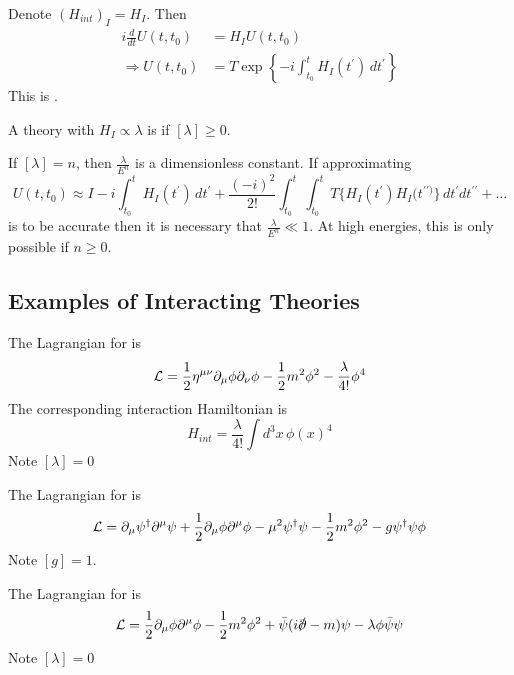 \documentclass{article}
\begin{document}
\begin{theorem}
Denote $(H_{int})_I = H_I$. Then 
\begin{align*}
i \frac{d}{dt} U(t,t_0) &= H_I U(t,t_0) \\
\Rightarrow U(t,t_0) &= T \exp\left\{ -i \int_{t_0}^t H_I(t^\prime) \, dt^\prime \right\}
\end{align*}
This is . 
\end{theorem}

\begin{definition}[Renormalizable]
A theory with $H_I \propto \lambda$ is  if $[\lambda]\geq0$. 
\end{definition}

\begin{idea}
If $[\lambda]=n$, then $\frac{\lambda}{E^n}$ is a dimensionless constant. If approximating 
\[
U(t,t_0) \approx I -i\int_{t_0}^t H_I(t^\prime) \, dt^\prime + \frac{(-i)^2}{2!}\int_{t_0}^t \int_{t_0}^t T\{ H_I(t^\prime) H_I(t^{\prime\prime)} \} \, dt^\prime dt^{\prime\prime} + \dots
\]
is to be accurate then it is necessary that $\frac{\lambda}{E^n} \ll 1$. At high energies, this is only possible if $n\geq0$.
\end{idea}

\subsection{Examples of Interacting Theories}

\begin{definition}
The Lagrangian for  is 
\[
\mathcal{L} = \frac{1}{2}\eta^{\mu\nu} \partial_\mu\phi \partial_\nu\phi-\frac{1}{2}m^2\phi^2 - \frac{\lambda}{4!}\phi^4
\]
The corresponding interaction Hamiltonian is 
\[
H_{int} = \frac{\lambda}{4!} \int d^3x \, {\phi(x)}^4
\]
Note $[\lambda]=0$
\end{definition}

\begin{definition}
The Lagrangian for  is 
\[
\mathcal{L} = \partial_\mu\psi^\dagger \partial^\mu\psi+\frac{1}{2}\partial_\mu\phi \partial^\mu\phi-\mu^2\psi^\dagger\psi-\frac{1}{2}m^2 \phi^2-g\psi^\dagger\psi\phi
\]
Note $[g]=1$.
\end{definition}

\begin{definition}
The Lagrangian for  is
\[
\mc{L} = \frac{1}{2}\del_\mu\phi \partial^\mu\phi-\frac{1}{2}m^2 \phi^2 + \bar{\psi}(i\slashed{\del}-m)\psi - \lambda\phi\bar{\psi}\psi
\]
Note $[\lambda] = 0$
\end{definition}
\end{document}
